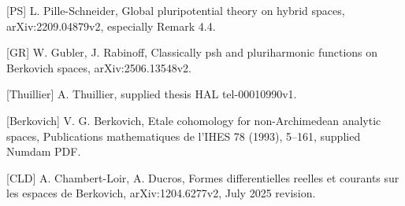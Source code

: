 \documentclass[11pt]{article}
\begin{document}
[PS] L. Pille-Schneider, Global pluripotential theory on hybrid spaces, arXiv:2209.04879v2, especially Remark 4.4.

[GR] W. Gubler, J. Rabinoff, Classically psh and pluriharmonic functions on Berkovich spaces, arXiv:2506.13548v2.

[Thuillier] A. Thuillier, supplied thesis HAL tel-00010990v1.

[Berkovich] V. G. Berkovich, Etale cohomology for non-Archimedean analytic spaces, Publications mathematiques de l'IHES 78 (1993), 5--161, supplied Numdam PDF.

[CLD] A. Chambert-Loir, A. Ducros, Formes differentielles reelles et courants sur les espaces de Berkovich, arXiv:1204.6277v2, July 2025 revision.
\end{document}
